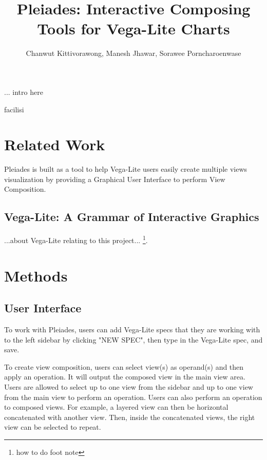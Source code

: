\documentclass[journal]{vgtc}                %
\title{Pleiades: Interactive Composing Tools for Vega-Lite Charts}
\author{Chanwut Kittivorawong, Manesh Jhawar, Sorawee Porncharoenwase}
\begin{document}


\maketitle

... intro here

facilisi~\cite{notes2002}

\section{Related Work}

Pleiades is built as a tool to help Vega-Lite users easily create multiple views
visualization by providing a Graphical User Interface to perform View Composition.

\subsection{Vega-Lite: A Grammar of Interactive Graphics}

...about Vega-Lite relating to this project...
\footnote{how to do foot note}.

\section{Methods}
\subsection{User Interface}

To work with Pleiades, users can add Vega-Lite specs that they are working with
to the left sidebar by clicking "NEW SPEC", then type in the Vega-Lite spec, and
save.

To create view composition, users can select view(s) as operand(s) and then apply
an operation. It will output the composed view in the main view area. Users are
allowed to select up to one view from the sidebar and up to one view from the main
view to perform an operation. Users can also perform an operation to composed views.
For example, a layered view can then be horizontal concatenated with another view.
Then, inside the concatenated views, the right view can be selected to repeat.
\end{document}
